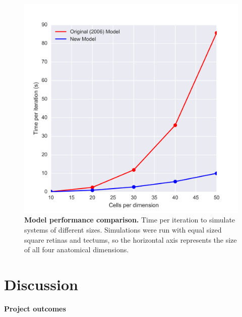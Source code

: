 \documentclass[11pt]{"article"}
\begin{document}
\begin{figure}
\includegraphics[scale=0.6]{ComputerSpeed}
\caption{\textbf{Model performance comparison.} Time per iteration to simulate systems of different sizes. Simulations were run with equal sized square retinas and tectums, so the horizontal axis represents the size of all four anatomical dimensions.}
\end{figure}


\section{Discussion}

\textbf{Project outcomes}
\end{document}
